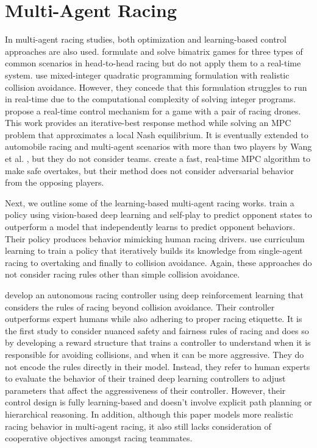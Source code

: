 \section{Multi-Agent Racing}
In multi-agent racing studies, both optimization and learning-based control approaches are also used. \citet{Liniger2020} formulate and solve bimatrix games for three types of common scenarios in head-to-head racing but do not apply them to a real-time system. \citet{Li2021} use mixed-integer quadratic programming formulation with realistic collision avoidance. However, they concede that this formulation struggles to run in real-time due to the computational complexity of solving integer programs. \citet{spica2020real} propose a real-time control mechanism for a game with a pair of racing drones. This work provides an iterative-best response method while solving an MPC problem that approximates a local Nash equilibrium. It is eventually extended to automobile racing and multi-agent scenarios with more than two players by Wang et al. \cite{Wang2019, Wang2021}, but they do not consider teams. \citet{He2021} create a fast, real-time MPC algorithm to make safe overtakes, but their method does not consider adversarial behavior from the opposing players. 

Next, we outline some of the learning-based multi-agent racing works. \citet{Schwarting2021} train a policy using vision-based deep learning and self-play to predict opponent states to outperform a model that independently learns to predict opponent behaviors. Their policy produces behavior mimicking human racing drivers. \citet{Song2021} use curriculum learning to train a policy that iteratively builds its knowledge from single-agent racing to overtaking and finally to collision avoidance. Again, these approaches do not consider racing rules other than simple collision avoidance. 

\citet{sonyai} develop an autonomous racing controller using deep reinforcement learning that considers the rules of racing beyond collision avoidance. Their controller outperforms expert humans while also adhering to proper racing etiquette. It is the first study to consider nuanced safety and fairness rules of racing and does so by developing a reward structure that trains a controller to understand when it is responsible for avoiding collisions, and when it can be more aggressive. They do not encode the rules directly in their model. Instead, they refer to human experts to evaluate the behavior of their trained deep learning controllers to adjust parameters that affect the aggressiveness of their controller. However, their control design is fully learning-based and doesn't involve explicit path planning or hierarchical reasoning. In addition, although this paper models more realistic racing behavior in multi-agent racing, it also still lacks consideration of cooperative objectives amongst racing teammates. 

